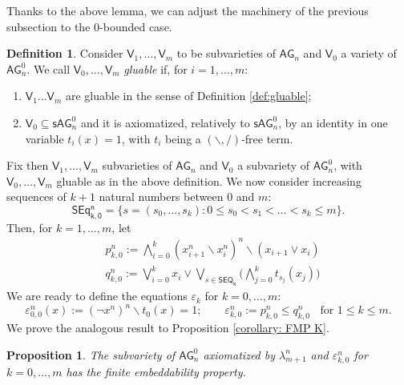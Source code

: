 \documentclass{amsart}
\newtheorem{proposition}[theorem]{Proposition}
\theoremstyle{definition}
\newtheorem{definition}[theorem]{Definition}
\numberwithin{equation}{section}
\newcommand{\join}{\vee}
\newcommand{\vv}[1]{\mathsf {#1}}
\newcommand{\sse}{\subseteq}
\newcommand{\BG}{\vv{AG}}
\newcommand{\ssBG}{\vv{sAG}}
\begin{document}
Thanks to the above lemma, we can adjust the machinery of the previous subsection to the $0$-bounded case. 
\begin{definition}\label{def:gluable0}
	Consider $\vv V_1, \ldots, \vv V_m$ to be subvarieties of $\BG_n$ and $\vv V_0$ a variety of $\BG_n^0$. We call  $\vv V_0, \ldots, \vv V_m$ {\em gluable} if, for $i = 1, \ldots, m$:
\begin{enumerate}
	\item $\vv V_1 \ldots \vv V_m$ are gluable in the sense of Definition \ref{def:gluable};
	\item $\vv V_0\sse \ssBG^0_n$ and it is axiomatized, relatively to $\ssBG_n^0$, by an identity in one variable $t_i(x) = 1$, with $t_i$ being a $(\backslash,/)$-free term.
\end{enumerate}
\end{definition} 
Fix then $\vv V_1, \ldots, \vv V_m$ subvarieties of $\BG_n$ and $\vv V_0$ a subvariety of $\BG_n^0$, with $\vv V_0, \ldots, \vv V_m$  gluable as in the above definition.
We now consider increasing sequences of $k+1$ natural numbers between $0$ and $m$:
$$
\vv{SEq_{k,0}^n}=\{ s=(s_0, \dots, s_k) : 0 \leq s_0 <s_1 < \dots < s_k \leq m \}.
$$
Then, for $k=1, \dots , m$, let
\begin{align*}
	& p_{k,0}^n := \bigwedge_{i=0}^{k}(x_{i+1}^n \backslash x_i^n)^n \backslash (x_{i+1}\join x_i)\\
	& q_{k,0}^n := \bigvee_{i=0}^k x_i \join \bigvee_{s \in \vv{SEQ_k}} \Biggl ( \bigwedge_{j=0}^kt_{s_j}(x_j) \Biggr) 
\end{align*}
We are ready to define the equations $\varepsilon_k$ for $k=0, \dots, m$:
\begin{equation}
	\varepsilon_{0,0}^n(x):=(\neg x^n)^n \backslash t_0(x) = 1; \qquad \varepsilon_{k,0}^n:= p_{k,0}^n \leq q_{k,0}^n \;\;\mbox{ for } 1\leq k \leq m.
\end{equation} 
We prove the analogous result to Proposition \ref{corollary: FMP K}.
\begin{proposition}\label{corollary: FMP KO}
	The subvariety of $\BG_n^0$ axiomatized by $\lambda_{m+1}^n$ and $\varepsilon_{k,0}^n$ for $k=0, \dots, m$ has the finite embeddability property.
\end{proposition}
\end{document}
